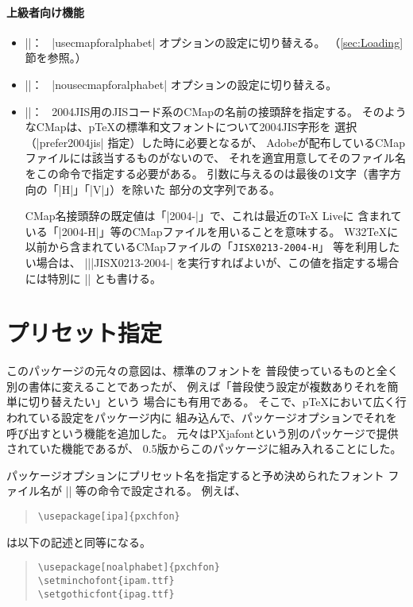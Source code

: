 \documentclass[a4paper,uplatex]{jsarticle}
\newcommand{\Pkg}[1]{\textsf{#1}}
\newcommand{\Meta}[1]{$\langle$\mbox{}#1\mbox{}$\rangle$}
\newcommand{\Means}{：\ }
\providecommand{\pTeX}{p\TeX}
\begin{document}
\paragraph{上級者向け機能}
\begin{itemize}
\item |\usecmapforalphabet|\Means
  |usecmapforalphabet| オプションの設定に切り替える。
  （\ref{sec:Loading}節を参照。）
\item |\nousecmapforalphabet|\Means
  |nousecmapforalphabet| オプションの設定に切り替える。
\item |\setnewglyphcmapprefix{|\Meta{文字列}|}|\Means
  2004JIS用のJISコード系のCMapの名前の接頭辞を指定する。
  そのようなCMapは、{\pTeX}の標準和文フォントについて2004JIS字形を
  選択（|prefer2004jis| 指定）した時に必要となるが、
  Adobeが配布しているCMapファイルには該当するものがないので、
  それを適宜用意してそのファイル名をこの命令で指定する必要がある。
  引数に与えるのは最後の1文字（書字方向の「|H|」「|V|」）を除いた
  部分の文字列である。\par
  CMap名接頭辞の既定値は「|2004-|」で、これは最近のTeX Liveに
  含まれている「|2004-H|」等のCMapファイルを用いることを意味する。
  W32TeXに以前から含まれているCMapファイルの「\texttt{JISX0213-2004-H}」
  等を利用したい場合は、
  |\setnewglyphcmapprefix|\linebreak[0]|{JISX0213-2004-}|
  を実行すればよいが、この値を指定する場合には特別に %
  |\setnewglyphcmapprefix{*}|
  とも書ける。
\end{itemize}

\section{プリセット指定}

このパッケージの元々の意図は、標準のフォントを
普段使っているものと全く別の書体に変えることであったが、
例えば「普段使う設定が複数ありそれを簡単に切り替えたい」という
場合にも有用である。
そこで、{\pTeX}において広く行われている設定をパッケージ内に
組み込んで、パッケージオプションでそれを呼び出すという機能を追加した。
元々は\Pkg{PXjafont}という別のパッケージで提供されていた機能であるが、
0.5版からこのパッケージに組み入れることにした。

パッケージオプションにプリセット名を指定すると予め決められたフォント
ファイル名が |\setminchofont| 等の命令で設定される。
例えば、
\begin{quote}\small\begin{verbatim}
\usepackage[ipa]{pxchfon}
\end{verbatim}\end{quote}
は以下の記述と同等になる。
\begin{quote}\small\begin{verbatim}
\usepackage[noalphabet]{pxchfon}
\setminchofont{ipam.ttf}
\setgothicfont{ipag.ttf}
\end{verbatim}\end{quote}
\end{document}
